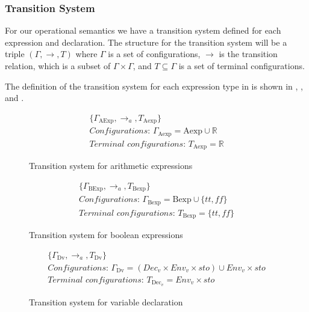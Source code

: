\subsubsection*{Transition System}

For our operational semantics we have a transition system defined for each expression and declaration. 
The structure for the transition system will be a triple $(\Gamma,\rightarrow,T)$ where $\Gamma$ is a set of configurations, $\rightarrow$ is the transition relation, which is a subset of $\Gamma\times\Gamma$, and $T\subseteq \Gamma$ is a set of terminal configurations. \cite{huttelTransitionsTreesIntroduction2010}

The definition of the transition system for each expression type in \dazel{} is shown in , ,  and . 
\begin{figure}[htbp]
	\begin{gather*} 
		\{ \Gamma_\text{AExp}, \rightarrow_a, T_\text{Aexp} \} \\ 
		\textit{Configurations: } \Gamma_\text{Aexp} = \text{Aexp} \cup \mathbb{R} \\ 
		\textit{Terminal configurations: } T_\text{Aexp} = \mathbb{R}
	\end{gather*}
	\caption{Transition system for arithmetic expressions}
	\label{fig:TSAexp}
\end{figure}

\begin{figure}[htbp]
	\begin{gather*} 
		\{ \Gamma_\text{BExp}, \rightarrow_a, T_\text{Bexp} \} \\ 
		\textit{Configurations: } \Gamma_\text{Bexp} = \text{Bexp} \cup \{tt, f\!f\} \\ 
		\textit{Terminal configurations: } T_\text{Bexp} = \{tt, f\!f\}
	\end{gather*}
	\caption{Transition system for boolean expressions}
	\label{fig:TSBexp}
\end{figure}

\begin{figure}[htbp]
	\begin{gather*} 
		\{ \Gamma_\text{Dv}, \rightarrow_a, T_\text{Dv} \} \\ 
		\textit{Configurations: } \Gamma_\text{Dv} = (Dec_v \times Env_v \times sto) \cup Env_v \times sto \\ 
		\textit{Terminal configurations: } T_{\text{Dec}_v} = Env_v \times sto
	\end{gather*} 
	\caption{Transition system for variable declaration}
	\label{fig:TSDecv}
\end{figure}

